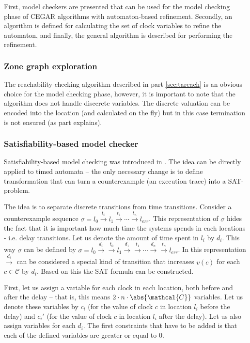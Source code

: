 First, model checkers are presented that can be used for the model checking phase of CEGAR algorithms with automaton-based refinement. Secondly, an algorithm is defined for calculating the set of clock variables to refine the automaton, and finally, the general algorithm is described for performing the refinement.

\subsubsection{Zone graph exploration} 

The reachability-checking algorithm described in part \ref{sec:tareach} is an obvious choice for the model checking phase, however, it is important to note that the algorithm does not handle discerete variables. The discrete valuation can be encoded into the location (and calculated on the fly) but in this case termination is not ensured (as part  explains).

\subsubsection{Satisfiability-based model checker}\label{sec:satmc}

Satisfiability-based model checking was introduced in . The idea can be directly applied to timed automata -- the only necessary change is to define transformation that can turn a counterexample (an execution trace) into a SAT-problem.

The idea is to separate discrete transitions from time transitions. Consider a counterexample sequence $\sigma = l_0 \xrightarrow{t_0} l_1 \xrightarrow{t_1} \cdots \xrightarrow{t_n} l_{err}$.  This representation of $\sigma$ hides the fact that it is important how much time the systems spends in each locations - i.e. delay transitions. Let us denote the amount of time spent in $l_i$ by $d_i$. This way $\sigma$ can be defined by $\sigma = l_0 \xrightarrow{d_0} \xrightarrow{t_0} l_1 \xrightarrow{d_1} \xrightarrow{t_1} \cdots \xrightarrow{d_n} \xrightarrow{t_n} l_{err}$. In this representation $\xrightarrow{d_i}$ can be considered a special kind of transition that increases $v(c)$ for each $c \in \mathcal{C}$ by $d_i$. Based on this the SAT formula can be constructed.

First, let us assign a variable for each clock in each location, both before and after the delay -- that is, this means $2\cdot n \cdot \abs{\mathcal{C}}$ variables. Let us denote these variables by $c_i$ (for the value of clock $c$ in location $l_i$ before the delay) and $c_i'$ (for the value of clock $c$ in location $l_i$ after the delay). Let us also assign variables for each $d_i$. The first constraints that have to be added is that each of the defined variables are greater or equal to 0.


